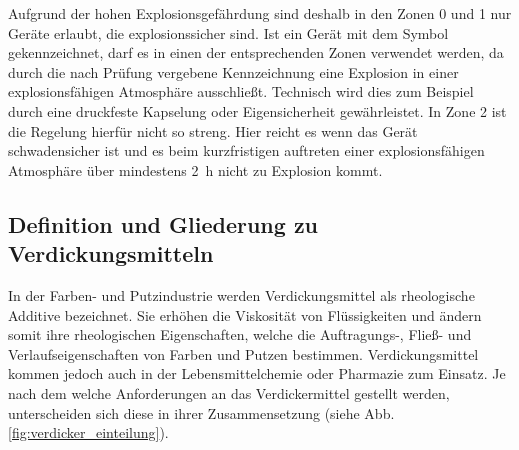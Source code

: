 Aufgrund der hohen Explosionsgefährdung sind deshalb in den Zonen 0 und 1 nur Geräte erlaubt, die explosionssicher sind. Ist ein Gerät mit dem Symbol\,\exsymbol\, gekennzeichnet, darf es in einen der entsprechenden Zonen verwendet werden, da durch die nach Prüfung vergebene Kennzeichnung eine Explosion in einer explosionsfähigen Atmosphäre ausschließt. Technisch wird dies zum Beispiel durch eine druckfeste Kapselung oder Eigensicherheit gewährleistet. In Zone 2 ist die Regelung hierfür nicht so streng. Hier reicht es wenn das Gerät schwadensicher ist und es beim kurzfristigen auftreten einer explosionsfähigen Atmosphäre über mindestens \SI{2}{\hour} nicht zu Explosion kommt. \cite{Ignatowitz.2015}


\subsection{Definition und Gliederung zu Verdickungsmitteln}

In der Farben- und Putzindustrie werden Verdickungsmittel als rheologische Additive bezeichnet. Sie erhöhen die Viskosität von Flüssigkeiten und ändern somit ihre rheologischen Eigenschaften, welche die Auftragungs-, Fließ- und Verlaufseigenschaften von Farben und Putzen bestimmen. Verdickungsmittel kommen jedoch auch in der Lebensmittelchemie oder Pharmazie zum Einsatz. Je nach dem welche Anforderungen an das Verdickermittel gestellt werden, unterscheiden sich diese in ihrer Zusammensetzung (siehe Abb. \ref{fig:verdicker_einteilung}). \cite{Brock.2009}


